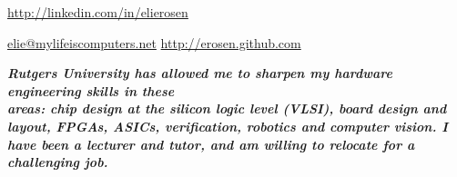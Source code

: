 \documentclass[10pt,a4paper]{article}
\begin{document}
\sloppy %

\centerline{\noindent\href{http://www.linkedin.com/in/elierosen}{http://linkedin.com/in/elierosen}}

\nobreakvspace{0.3em} %

\noindent\href{mailto:elie@mylifeiscomputers.net}{elie\mbox{}@\mbox{}mylifeiscomputers.net} \hfill \href{http://erosen.github.com}{http://erosen.github.com} \\

\spacedhrule{-0.6em}{-0.4em} %

\headedsection
{\textbf{\emph{\large{Rutgers University has allowed me to sharpen my hardware engineering skills in these \\areas: chip design at the silicon logic level (VLSI), board design and layout, FPGAs, ASICs, verification, robotics and computer vision. I have been a lecturer and tutor, and am willing to relocate for a challenging job.} }}}


\spacedhrule{0.6em}{-0.4em}


	
		{}
	
		{}

		{}
\end{document}
